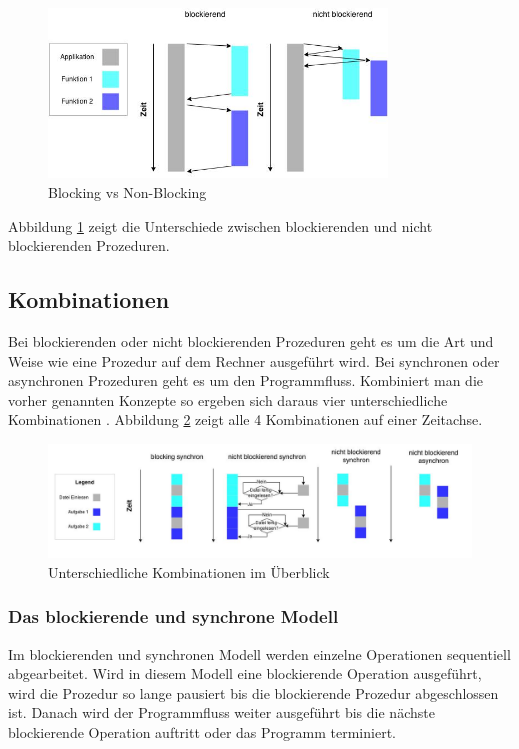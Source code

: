\begin{figure}[!htb]
  \centering
  \includegraphics[width=9cm]{images/blocking_vs_nonblocking.jpg}
  \caption{
    Blocking vs Non-Blocking
  }
  \label{figure:blocking_vs_non_blocking}
\end{figure}

Abbildung \ref{figure:blocking_vs_non_blocking} zeigt die Unterschiede zwischen blockierenden und nicht blockierenden Prozeduren.

\subsection{Kombinationen}
Bei blockierenden oder nicht blockierenden Prozeduren geht es um die Art und Weise wie eine Prozedur auf dem Rechner ausgeführt wird. Bei synchronen oder asynchronen Prozeduren geht es um den Programmfluss. Kombiniert man die vorher genannten Konzepte so ergeben sich daraus vier unterschiedliche Kombinationen \cite[p. 48]{Erb2012}. Abbildung \ref{figure:synchron_blocking} zeigt alle 4 Kombinationen auf einer Zeitachse. 

\begin{figure}[!htb]
  \centering
  \includegraphics[width=16cm]{images/synchron_blocking.jpg}
  \caption{
    Unterschiedliche Kombinationen im Überblick
  }
  \label{figure:synchron_blocking}
\end{figure}

\subsubsection{Das blockierende und synchrone Modell}
Im blockierenden und synchronen Modell werden einzelne Operationen sequentiell abgearbeitet. Wird in diesem Modell eine blockierende Operation ausgeführt, wird die Prozedur so lange pausiert bis die blockierende Prozedur abgeschlossen ist. Danach wird der Programmfluss weiter ausgeführt bis die nächste blockierende Operation auftritt oder das Programm terminiert.

